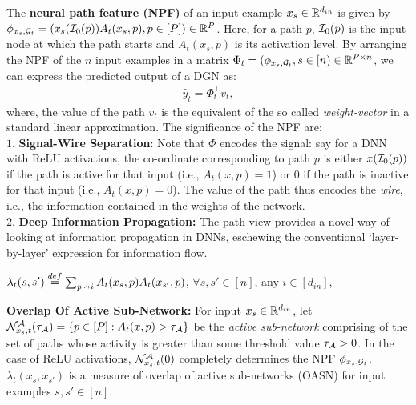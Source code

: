 The \textbf{neural path feature (NPF)} of an input example $x_s\in \mathbb{R}^{d_{in}}$ is given by $\phi_{x_s,\mathcal{G}_t}=(x_s(\mathcal{I}_0(p))A_t(x_s,p) ,p\in[P])\in\mathbb{R}^P$. Here, for a path $p$, $\mathcal{I}_0(p)$ is the input node at which the path starts and $A_t(x_s,p)$ is its activation level. By arranging the NPF of the $n$ input examples in a matrix $\Phi_t=(\phi_{x_s,\mathcal{G}_t},s\in[n)\in\mathbb{R}^{P\times n}$, we can express the predicted output of a DGN as: 
\begin{align}\label{eq:npfbasic}
\hat{y}_t=\Phi_t^\top v_t,
\end{align}
where, the value of the path $v_t$ is the equivalent of the so called \emph{weight-vector} in a standard linear approximation. 
The significance of the NPF are:\hfill\\
$1.$ \textbf{Signal-Wire Separation}: Note that $\Phi$ encodes the signal: say for a DNN with ReLU activations, the co-ordinate corresponding to path $p$ is either $x(\mathcal{I}_0(p))$ if the path is active for that input (i.e., $A_t(x,p)=1$) or $0$ if the path is inactive for that input  (i.e., $A_t(x,p)=0$). The value of the path thus encodes the \emph{wire}, i.e., the information contained in the weights of the network. \hfill\\
$2.$ \textbf{Deep Information Propagation:} The path view provides a novel way of looking at information propagation in DNNs, eschewing the conventional `layer-by-layer' expression for information flow.\hfill\\
\begin{definition}\label{def:lambda}
$\lambda_t(s,s')\stackrel{def}{=}\sum_{p\rightsquigarrow i} A_t(x_s,p) A_t(x_{s'},p)$, $\forall s,s'\in[n]$, any $i\in [d_{in}]$,  
 \end{definition} 
 \textbf{Overlap Of Active Sub-Network:}  For input $x_s\in\mathbb{R}^{d_{in}}$, let $\mathcal{N}^{\mathcal{A}}_{x_s,t}(\tau_{\mathcal{A}})=\{p\in[P]:A_t(x,p)>\tau_{\mathcal{A}}\}$ be the \emph{active sub-network} comprising of the set of paths whose activity is greater than some threshold value $\tau_{\mathcal{A}}>0$. In the case of ReLU activations, $\mathcal{N}^{\mathcal{A}}_{x_s,t}(0)$ completely determines the NPF $\phi_{x_s,\mathcal{G}_t}$.  $\lambda_t(x_s,x_{s'})$ is a measure of overlap of active sub-networks (OASN) for input examples $s,s'\in[n]$.
 
